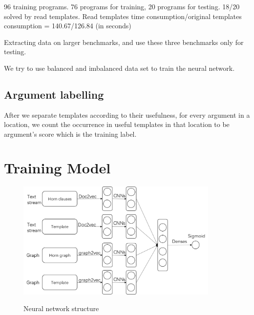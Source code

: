\documentclass{article}
\begin{document}
96 training programs. 76 programs for training, 20 programs for testing.
18/20 solved by read templates. Read templates time consumption/original templates consumption =  140.67/126.84 (in seconds)

Extracting data on larger benchmarks, and use these three benchmarks only for testing.






We try to use balanced and imbalanced data set to train the neural network.


\subsection{Argument labelling}
After we separate templates according to their usefulness, for every argument in a location, we count the occurrence in useful templates in that location to be argument's score which is the training label.

\section{Training Model}


\begin{figure}[h]
\centering
  \includegraphics[width=10cm]{graph/NNstructure}\\
  \caption{Neural network structure}\label{NNstructure}
\end{figure}
\end{document}
